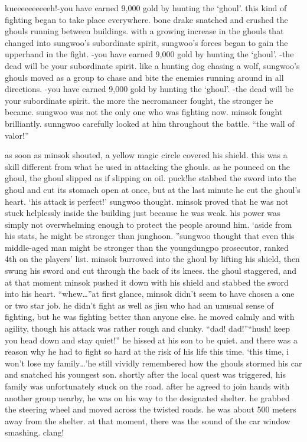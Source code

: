 kueeeeeeeeeeh!-you have earned 9,000 gold by hunting the ‘ghoul’.
this kind of fighting began to take place everywhere.
bone drake snatched and crushed the ghouls running between buildings.
 with a growing increase in the ghouls that changed into sungwoo’s subordinate spirit, sungwoo’s forces began to gain the upperhand in the fight.
-you have earned 9,000 gold by hunting the ‘ghoul’.
-the dead will be your subordinate spirit.
like a hunting dog chasing a wolf, sungwoo’s ghouls moved as a group to chase and bite the enemies running around in all directions.
-you have earned 9,000 gold by hunting the ‘ghoul’.
-the dead will be your subordinate spirit.
the more the necromancer fought, the stronger he became.
 sungwoo was not the only one who was fighting now.
 minsok fought brilliantly.
 sunngwoo carefully looked at him throughout the battle.
“the wall of valor!”

as soon as minsok shouted, a yellow magic circle covered his shield.
 this was a skill different from what he used in attacking the ghouls.
 as he pounced on the ghoul, the ghoul slipped as if slipping on oil.
puck!he stabbed the sword into the ghoul and cut its stomach open at once, but at the last minute he cut the ghoul’s heart.
‘his attack is perfect!’ sungwoo thought.
minsok proved that he was not stuck helplessly inside the building just because he was weak.
his power was simply not overwhelming enough to protect the people around him.
‘aside from his stats, he might be stronger than junghoon.
”sungwoo thought that even this middle-aged man might be stronger than the youngdungpo prosecutor, ranked 4th on the players’ list.
minsok burrowed into the ghoul by lifting his shield, then swung his sword and cut through the back of its knees.
 the ghoul staggered, and at that moment minsok pushed it down with his shield and stabbed the sword into his heart.
“whew…”at first glance, minsok didn’t seem to have chosen a one or two star job.
 he didn’t fight as well as jisu who had an unusual sense of fighting, but he was fighting better than anyone else.
 he moved calmly and with agility, though his attack was rather rough and clunky.
“dad! dad!”“hush! keep you head down and stay quiet!” he hissed at his son to be quiet.
and there was a reason why he had to fight so hard at the risk of his life this time.
‘this time, i won’t lose my family…’he still vividly remembered how the ghouls stormed his car and snatched his youngest son.
shortly after the local quest was triggered, his family was unfortunately stuck on the road.
after he agreed to join hands with another group nearby, he was on his way to the designated shelter.
he grabbed the steering wheel and moved across the twisted roads.
 he was about 500 meters away from the shelter.
at that moment, there was the sound of the car window smashing.
clang!

 